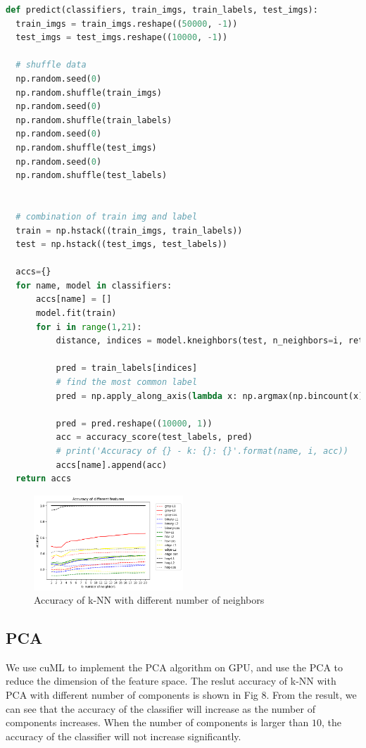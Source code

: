 \documentclass[11pt]{article}
\begin{document}
\begin{lstlisting}[language=Python,caption={k-NN Classifier on GPU with different neighbors}]
def predict(classifiers, train_imgs, train_labels, test_imgs):
  train_imgs = train_imgs.reshape((50000, -1))
  test_imgs = test_imgs.reshape((10000, -1))

  # shuffle data
  np.random.seed(0)
  np.random.shuffle(train_imgs)
  np.random.seed(0)
  np.random.shuffle(train_labels)
  np.random.seed(0)
  np.random.shuffle(test_imgs)
  np.random.seed(0)
  np.random.shuffle(test_labels)
  

  # combination of train img and label
  train = np.hstack((train_imgs, train_labels))
  test = np.hstack((test_imgs, test_labels))

  accs={}
  for name, model in classifiers:
      accs[name] = []
      model.fit(train)
      for i in range(1,21):
          distance, indices = model.kneighbors(test, n_neighbors=i, return_distance=True)
      
          pred = train_labels[indices]
          # find the most common label
          pred = np.apply_along_axis(lambda x: np.argmax(np.bincount(x)), axis=1, arr=pred)
          
          pred = pred.reshape((10000, 1))
          acc = accuracy_score(test_labels, pred)
          # print('Accuracy of {} - k: {}: {}'.format(name, i, acc))
          accs[name].append(acc)
  return accs
\end{lstlisting}

\begin{figure}
    \centering
    \includegraphics[width=0.5\textwidth]{knn.png}
    \caption{Accuracy of k-NN with different number of neighbors}
    \label{fig:knn}
\end{figure}

\subsection{PCA}
We use cuML to implement the PCA algorithm on GPU, and use the PCA to reduce the dimension of the feature space.
The reslut accuracy of k-NN with PCA with different number of components is shown in Fig 8. From the result, we can see that the accuracy of the classifier will increase as the number of components increases. 
When the number of components is larger than $10$, the accuracy of the classifier will not increase significantly.
\end{document}
